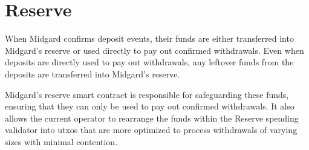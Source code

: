 \documentclass[../midgard.tex]{subfiles}
\begin{document}
\section{Reserve}
\label{h:reserve}

When Midgard confirms deposit events, their funds are either transferred into Midgard's reserve or used directly to pay out confirmed withdrawals.
Even when deposits are directly used to pay out withdrawals, any leftover funds from the deposits are transferred into Midgard's reserve.

Midgard's reserve smart contract is responsible for safeguarding these funds, ensuring that they can only be used to pay out confirmed withdrawals.
It also allows the current operator to rearrange the funds within the Reserve spending validator into utxos that are more optimized to process withdrawals of varying sizes with minimal contention.
\todo
\end{document}
